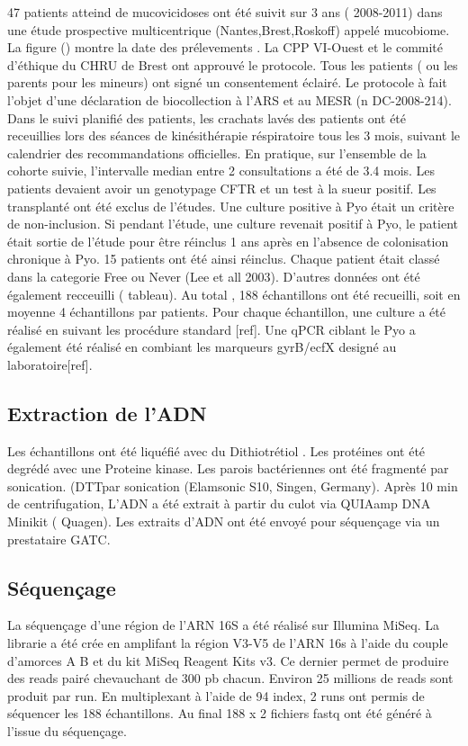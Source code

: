 \documentclass[12pt,a4paper]{article}
\begin{document}
47 patients atteind de mucovicidoses ont été suivit sur 3 ans ( 2008-2011) dans une étude prospective multicentrique (Nantes,Brest,Roskoff) appelé mucobiome.
La figure () montre la date des prélevements .
La CPP VI-Ouest et le commité d’éthique du CHRU de Brest ont approuvé le protocole. Tous les patients ( ou les parents pour les mineurs) ont signé un consentement éclairé. Le protocole à fait l’objet d’une déclaration de biocollection à l’ARS et au MESR (n DC-2008-214).
Dans le suivi planifié des patients, les crachats lavés des patients ont été receuillies lors des séances de kinésithérapie réspiratoire tous les 3 mois, suivant le calendrier des recommandations officielles. En pratique, sur l’ensemble de la cohorte suivie, l’intervalle median entre 2 consultations a été de 3.4 mois.
Les patients devaient avoir un genotypage CFTR et un test à la sueur positif. Les transplanté ont été exclus de l’études.
Une culture positive à Pyo était un critère de non-inclusion. Si pendant l’étude, une culture revenait positif à Pyo, le patient était sortie de l’étude pour être réinclus 1 ans après en l’absence de colonisation chronique à Pyo. 15 patients ont été ainsi réinclus.
Chaque patient était classé dans la categorie Free ou Never (Lee et all 2003). D’autres données ont été également recceuilli ( tableau).
Au total , 188 échantillons ont été recueilli, soit en moyenne 4 échantillons par patients.
Pour chaque échantillon, une culture a été réalisé en suivant les procédure standard [ref]. Une qPCR ciblant le Pyo a également été réalisé en combiant les marqueurs gyrB/ecfX designé au laboratoire[ref].

\subsection{Extraction de l’ADN}

Les échantillons ont été liquéfié avec du Dithiotrétiol . Les protéines ont été degrédé avec une Proteine kinase.
Les parois bactériennes ont été fragmenté par sonication. (DTTpar sonication (Elamsonic S10, Singen, Germany). Après 10 min de centrifugation, L’ADN a été extrait à partir du culot via QUIAamp DNA Minikit ( Quagen).
Les extraits d’ADN ont été envoyé pour séquençage via un prestataire GATC.

\subsection{Séquençage}

La séquençage d’une région de l’ARN 16S a été réalisé sur Illumina MiSeq.
La librarie a été crée en amplifant la région V3-V5 de l’ARN 16s à l’aide du couple d’amorces A B et du kit MiSeq Reagent Kits v3.
Ce dernier permet de produire des reads pairé chevauchant de 300 pb chacun. Environ 25 millions de reads sont produit par run.
En multiplexant à l’aide de 94 index, 2 runs ont permis de séquencer les 188 échantillons.
Au final 188 x 2 fichiers fastq ont été généré à l’issue du séquençage.
\end{document}
